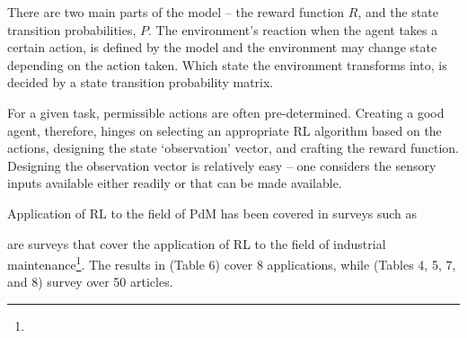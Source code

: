 \documentclass{article}
\begin{document}
There are two main parts of the model -- the reward function $R$, and the state transition probabilities, $P$. The environment's reaction when the agent takes a certain action, is defined by the model and the environment may change state depending on the action taken. Which state the environment transforms into, is decided by a state transition probability matrix. 

For a given task, permissible actions are often pre-determined. Creating a good agent, therefore, hinges on selecting an appropriate RL algorithm based on the actions, designing the state `observation' vector, and crafting the reward function. Designing the observation vector is relatively easy -- one considers the sensory inputs available either readily or that can be made available. 

Application of RL to the field of PdM has been covered in surveys such as \cite{Erhan2021Smart, Ren2021, Barja-Martinez2021, panzer2022, siraskar2023}

\cite{panzer2022, siraskar2023} are surveys that cover the application of RL to the field of industrial maintenance\footnote{}. The results in \cite{panzer2022} (Table 6) cover 8 applications, while \cite{siraskar2023} (Tables 4, 5, 7, and 8) survey over 50 articles. 
\end{document}
